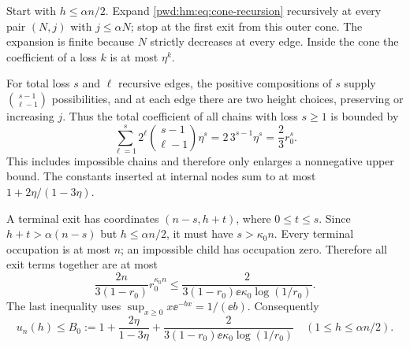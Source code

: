 \documentclass[11pt,letterpaper]{article}
\numberwithin{equation}{section}
\theoremstyle{remark}\newtheorem{remark}[theorem]{Remark}
\begin{document}
Start with $h\le\alpha n/2$. Expand \eqref{pwd:hm:eq:cone-recursion} recursively at every pair $(N,j)$ with $j\le\alpha N$; stop at the first exit from this outer cone. The expansion is finite because $N$ strictly decreases at every edge. Inside the cone the coefficient of a loss $k$ is at most $\eta^k$.

For total loss $s$ and $\ell$ recursive edges, the positive compositions of $s$ supply $\binom{s-1}{\ell-1}$ possibilities, and at each edge there are two height choices, preserving or increasing $j$. Thus the total coefficient of all chains with loss $s\ge1$ is bounded by
\begin{equation}\label{pwd:hm:eq:chain-count}
 \sum_{\ell=1}^s2^\ell\binom{s-1}{\ell-1}\eta^s
 =2\,3^{s-1}\eta^s=\frac23r_0^s.
\end{equation}
This includes impossible chains and therefore only enlarges a nonnegative upper bound. The constants inserted at internal nodes sum to at most
$1+2\eta/(1-3\eta)$.

A terminal exit has coordinates $(n-s,h+t)$, where $0\le t\le s$. Since $h+t>\alpha(n-s)$ but $h\le\alpha n/2$, it must have $s>\kappa_0n$. Every terminal occupation is at most $n$; an impossible child has occupation zero. Therefore all exit terms together are at most
\begin{equation}\label{pwd:hm:eq:exit-bound}
 \frac{2n}{3(1-r_0)}r_0^{\kappa_0n}
 \le\frac{2}{3(1-r_0)\ee\kappa_0\log(1/r_0)}.
\end{equation}
The last inequality uses $\sup_{x\ge0}x\ee^{-bx}=1/(\ee b)$. Consequently
\begin{equation}\label{pwd:hm:eq:B-bound}
 u_n(h)\le B_0:=1+\frac{2\eta}{1-3\eta}
 +\frac{2}{3(1-r_0)\ee\kappa_0\log(1/r_0)}
 \quad(1\le h\le\alpha n/2).
\end{equation}
\end{document}

